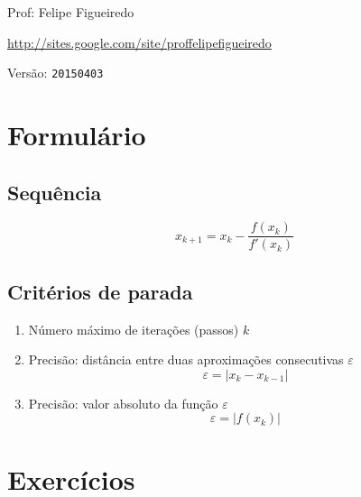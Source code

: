 \documentclass[a4paper]{article}
\begin{document}
\parbox[c]{.825\textwidth}{\raggedright%
{Prof: Felipe Figueiredo\par}
{\url{http://sites.google.com/site/proffelipefigueiredo}\par}
}

Versão: \verb|20150403|


\section{Formulário}

\subsection*{Sequência}

\begin{displaymath}
  x_{k+1} = x_k - \frac{f(x_k)}{f'(x_k)}
\end{displaymath}

\subsection*{Critérios de parada}

\begin{enumerate}
\item Número máximo de iterações (passos) $k$

\item Precisão: distância entre duas aproximações consecutivas
  $\varepsilon$ 
  \begin{displaymath}
    \varepsilon = |x_k - x_{k-1}|
  \end{displaymath}

\item Precisão: valor absoluto da função $\varepsilon$
  \begin{displaymath}
    \varepsilon = |f(x_k)|
  \end{displaymath}

\end{enumerate}

\section{Exercícios}
\end{document}
